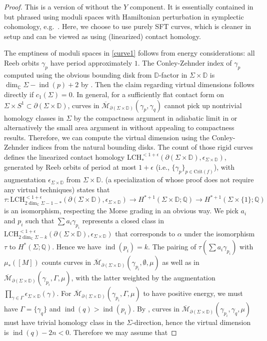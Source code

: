 \documentclass[11pt]{amsart}
\numberwithin{equation}{section}
\def\C{{\mathbb C}}
\def\D{{\mathbb D}}
\def\Q{{\mathbb Q}}
\def\cM{{\mathcal M}}
\DeclareMathOperator{\ind}{ind}
\begin{document}
\begin{proof}
    This is a version of \cite[Proposition 4.5]{bowden2022tight} without the $Y$ component. It is essentially contained in \cite{zbMATH07673358} but phrased using moduli spaces with Hamiltonian perturbation in symplectic cohomology, e.g.\ \cite[Proposition 4.5]{bowden2022tight}. Here, we choose to use purely SFT curves, which is cleaner in setup and can be viewed as using (linearized) contact homology. 

     The emptiness of moduli spaces in \eqref{curve1} follows from energy considerations: all Reeb orbits $\gamma_p$ have period approximately $1$. The Conley-Zehnder index of $\gamma_p$ computed using the obvious bounding disk from $\D$-factor in $\Sigma \times \D$ is $\dim_{\C}\Sigma-\ind(p)+2$ by \cite[Theorem 6.3]{zbMATH07367119}. Then the claim regarding virtual dimensions follows directly if $c_1(\Sigma)=0$. In general, for a sufficiently flat contact form on $\Sigma \times S^1\subset \partial(\Sigma \times \D)$, curves in $\overline{\cM}_{\partial(\Sigma \times \D)}(\gamma_p,\gamma_q)$ cannot pick up nontrivial homology classes in $\Sigma$ by the compactness argument in adiabatic limit in \cite[Proposition 3.1]{zbMATH07673358} or alternatively the small area argument in \cite[Proposition 4.6]{arXiv:2506.06807} without appealing to compactness results. Therefore, we can compute the virtual dimension using the Conley-Zehnder indices from the natural bounding disks. The count of those rigid curves defines the linearized contact homology $\mathrm{LCH}^{<1+\epsilon}_*(\partial(\Sigma\times \D),\epsilon_{\Sigma \times \D})$, generated by Reeb orbits of period at most $1+\epsilon$ (i.e., $\{\gamma_p\}_{p\in \mathrm{Crit}(f)}$), with augmentation $\epsilon_{\Sigma \times \D}$ from $\Sigma \times \D$. \cite[Theorem 4.3]{arXiv:2506.06807} (a specialization of  whose proof does not require any virtual techniques) states that $\tau:\mathrm{LCH}^{<1+\epsilon}_{2\dim_{\C}\Sigma-1-*}(\partial(\Sigma\times \D),\epsilon_{\Sigma \times \D}) \to H^{*+1}(\Sigma\times \D;\Q)\to H^{*+1}(\Sigma\times\{1\};\Q)$ is an isomorphism, respecting the Morse grading in an obvious way. We pick $a_i$ and $p_i$ such that $\sum a_i\gamma_{p_i}$ represents a closed class in $\mathrm{LCH}^{<1+\epsilon}_{2\dim_{\C}\Sigma-k}(\partial(\Sigma\times \D),\epsilon_{\Sigma \times \D})$ that corresponds to $\alpha$ under the isomorphism $\tau$ to $H^*(\Sigma;\Q)$. Hence we have $\ind(p_i)=k$. The pairing of $\tau(\sum a_i\gamma_{p_i})$ with $\mu_*([M])$ counts curves in $\overline{\cM}_{\partial(\Sigma \times \D)}(\gamma_{p_i},\emptyset,\mu)$ as well as in $\overline{\cM}_{\partial(\Sigma \times \D)}(\gamma_{p_i},\Gamma,\mu)$, with the latter weighted by the augmentation $\prod_{\gamma \in \Gamma}\epsilon_{\Sigma \times \D}(\gamma)$. For $\overline{\cM}_{\partial(\Sigma \times \D)}(\gamma_{p_i},\Gamma,\mu)$ to have positive energy, we must have $\Gamma=\{\gamma_q\}$ and $\ind(q)>\ind(p_i)$. By \cite[Proposition 4.6]{arXiv:2506.06807}, curves in $\overline{\cM}_{\partial(\Sigma \times \D)}(\gamma_{p_i},\gamma_q,\mu)$ must have trivial homology class in the $\Sigma$-direction, hence the virtual dimension is $\ind(q)-2n<0$. Therefore we may assume that 
\end{proof}
\end{document}

